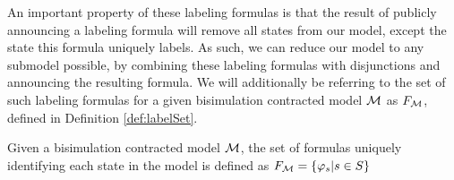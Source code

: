 An important property of these labeling formulas is that the result of publicly announcing a labeling formula will remove all states from our model, except the state this formula uniquely labels. As such, we can reduce our model to any submodel possible, by combining these labeling formulas with disjunctions and announcing the resulting formula. We will additionally be referring to the set of such labeling formulas for a given bisimulation contracted model $\mathcal{M}$ as $F_{\mathcal{M}}$, defined in Definition \ref{def:labelSet}.

\begin{definition}
	\label{def:labelSet}
	Given a bisimulation contracted model $\mathcal{M}$, the set of formulas uniquely identifying each state in the model is defined as $F_{\mathcal{M}} = \{\varphi_s | s \in S\}$
\end{definition}


